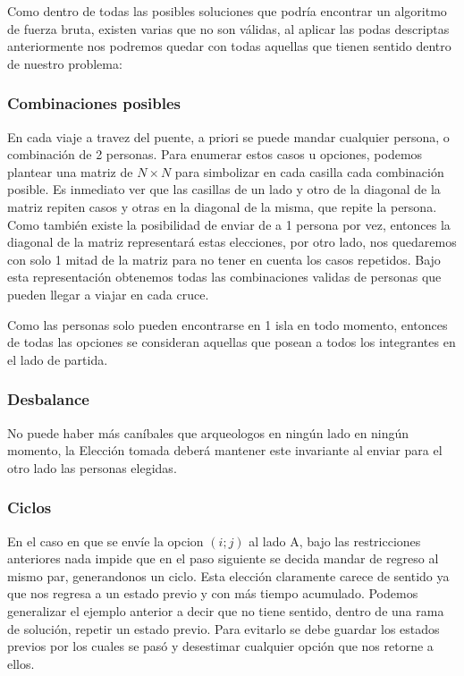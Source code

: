 Como dentro de todas las posibles soluciones que podría encontrar un algoritmo de fuerza bruta, existen varias que no son válidas, al aplicar las podas descriptas anteriormente nos podremos quedar con todas aquellas que tienen sentido dentro de nuestro problema:


\subsubsection*{Combinaciones posibles}
En cada viaje a travez del puente, a priori se puede mandar cualquier persona, o combinación de 2 personas. Para enumerar estos casos u opciones, podemos plantear una matriz de $N \times N$ para simbolizar en cada casilla cada combinación posible. Es inmediato ver que las casillas de un lado y otro de la diagonal de la matriz repiten casos y otras en la diagonal de la misma, que repite la persona. Como también existe la posibilidad de enviar de a 1 persona por vez, entonces la diagonal de la matriz representará estas elecciones, por otro lado, nos quedaremos con solo 1 mitad de la matriz para no tener en cuenta los casos repetidos. Bajo esta representación obtenemos todas las combinaciones validas de personas que pueden llegar a viajar en cada cruce.

Como las personas solo pueden encontrarse en 1 isla en todo momento, entonces de todas las opciones se consideran aquellas que posean a todos los integrantes en el lado de partida.

\subsubsection*{Desbalance}
No puede haber más caníbales que arqueologos en ning\'un lado en ningún momento, la Elección tomada deberá mantener este invariante al enviar para el otro lado las personas elegidas.

\subsubsection*{Ciclos}
En el caso en que se envíe la opcion $(i; j)$ al lado A, bajo las restricciones anteriores nada impide que en el paso siguiente se decida mandar de regreso al mismo par, generandonos un ciclo. Esta elección claramente carece de sentido ya que nos regresa a un estado previo y con más tiempo acumulado. Podemos generalizar el ejemplo anterior a decir que no tiene sentido, dentro de una rama de solución, repetir un estado previo. Para evitarlo se debe guardar los estados previos por los cuales se pasó y desestimar cualquier opción que nos retorne a ellos.

